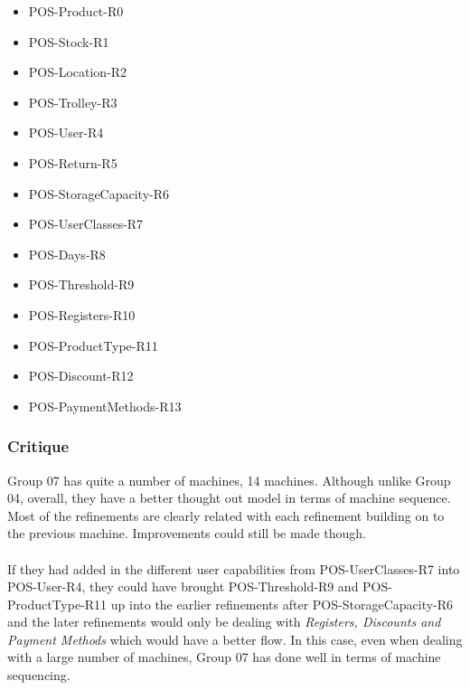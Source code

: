 \begin{itemize}
\item POS-Product-R0

\item POS-Stock-R1

\item POS-Location-R2

\item POS-Trolley-R3

\item POS-User-R4

\item POS-Return-R5

\item POS-StorageCapacity-R6

\item POS-UserClasses-R7

\item POS-Days-R8

\item POS-Threshold-R9

\item POS-Registers-R10

\item POS-ProductType-R11

\item POS-Discount-R12

\item POS-PaymentMethods-R13

\end{itemize}

\subsubsection{Critique}
\label{critique}

Group 07 has quite a number of machines, 14 machines. Although unlike Group 04, overall, they have a better thought out model in terms of machine sequence. Most of the refinements are clearly related with each refinement building on to the previous machine. Improvements could still be made though.  \\ \\  If they had added in the different user capabilities from POS-UserClasses-R7 into POS-User-R4, they could have brought POS-Threshold-R9 and POS-ProductType-R11 up into the earlier refinements after POS-StorageCapacity-R6 and the later refinements would only be dealing with \emph{Registers, Discounts and Payment Methods} which would have a better flow. In this case, even when dealing with a large number of machines, Group 07 has done well in terms of machine sequencing.

